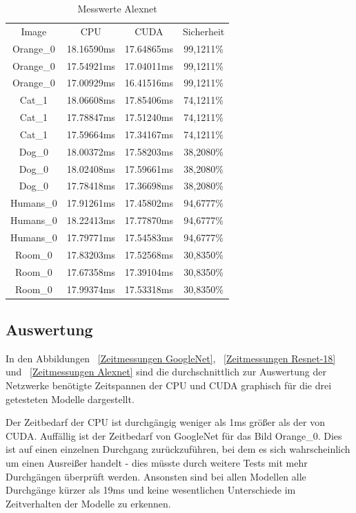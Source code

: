 \begin{table} [H]
	\centering
		\begin{tabular} {c c c c}
Image & CPU & CUDA & Sicherheit \\
Orange\_0	&	18.16590ms & 	17.64865ms&	99,1211\%\\
Orange\_0	&	17.54921ms  &	17.04011ms&	99,1211\%\\
Orange\_0	&	17.00929ms  &	16.41516ms&	99,1211\%\\
Cat\_1	&	18.06608ms  &	17.85406ms&	74,1211\%\\
Cat\_1	&	17.78847ms  &	17.51240ms&	74,1211\%\\
Cat\_1	&	17.59664ms  &	17.34167ms&	74,1211\%\\
Dog\_0	&	18.00372ms  &	17.58203ms&	38,2080\%\\
Dog\_0	&	18.02408ms  &	17.59661ms&	38,2080\%\\
Dog\_0	&	17.78418ms  &	17.36698ms&	38,2080\%\\
Humans\_0	&	17.91261ms  &	17.45802ms&	94,6777\%\\
Humans\_0	&	18.22413ms  &	17.77870ms&	94,6777\%\\
Humans\_0	&	17.79771ms  &	17.54583ms&	94,6777\%\\
Room\_0	&	17.83203ms  &	17.52568ms&	30,8350\%\\
Room\_0	&	17.67358ms  &	17.39104ms&	30,8350\%\\
Room\_0	&	17.99374ms  &	17.53318ms&	30,8350\%\\
		\end{tabular}
		\caption{Messwerte Alexnet}
		\label{Alexnet}
\end{table}

\subsection{Auswertung}

In den Abbildungen ~\ref{Zeitmessungen GoogleNet}, ~\ref{Zeitmessungen Resnet-18} und ~\ref{Zeitmessungen Alexnet} sind die durchschnittlich zur Auswertung der Netzwerke benötigte Zeitspannen der CPU und CUDA graphisch für die drei getesteten Modelle dargestellt.

\smallskip

Der Zeitbedarf der CPU ist durchgängig weniger als 1ms größer als der von CUDA. Auffällig ist der Zeitbedarf von GoogleNet für das Bild Orange\_0. Dies ist auf einen einzelnen Durchgang zurückzuführen, bei dem es sich wahrscheinlich um einen Ausreißer handelt - dies müsste durch weitere Tests mit mehr Durchgängen überprüft werden. Ansonsten sind bei allen Modellen alle Durchgänge kürzer als 19ms und keine wesentlichen Unterschiede im Zeitverhalten der Modelle zu erkennen.

